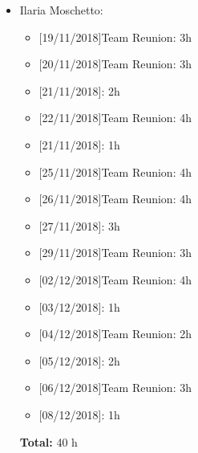 \begin{itemize}
\item Ilaria Moschetto: 
\begin{itemize}
    \item {[}19/11/2018{]}Team Reunion: 3h
    \item {[}20/11/2018{]}Team Reunion: 3h
    \item {[}21/11/2018{]}: 2h
    \item {[}22/11/2018{]}Team Reunion: 4h
    \item {[}21/11/2018{]}: 1h
    \item {[}25/11/2018{]}Team Reunion: 4h
    \item {[}26/11/2018{]}Team Reunion: 4h
    \item {[}27/11/2018{]}: 3h
    \item {[}29/11/2018{]}Team Reunion: 3h
    \item {[}02/12/2018{]}Team Reunion: 4h
    \item {[}03/12/2018{]}: 1h
    \item {[}04/12/2018{]}Team Reunion: 2h
    \item {[}05/12/2018{]}: 2h
    \item {[}06/12/2018{]}Team Reunion: 3h
    \item {[}08/12/2018{]}: 1h
\end{itemize}

\textbf{Total:} 40 h
\end{itemize}